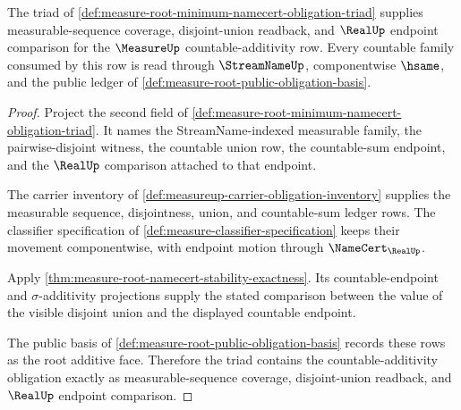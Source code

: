 \begin{theorem}
\label{thm:measure-root-minimum-countable-additivity-obligation}
The triad of
\autoref{def:measure-root-minimum-namecert-obligation-triad} supplies
measurable-sequence coverage, disjoint-union readback, and
$\RealUp$ endpoint comparison for the $\MeasureUp$ countable-additivity row.
Every countable family consumed by this row is read through
$\StreamNameUp$, componentwise $\hsame$, and the public ledger of
\autoref{def:measure-root-public-obligation-basis}.
\end{theorem}
\begin{proof}
Project the second field of
\autoref{def:measure-root-minimum-namecert-obligation-triad}. It names the
StreamName-indexed measurable family, the pairwise-disjoint witness, the
countable union row, the countable-sum endpoint, and the $\RealUp$ comparison
attached to that endpoint.

The carrier inventory of
\autoref{def:measureup-carrier-obligation-inventory} supplies the measurable
sequence, disjointness, union, and countable-sum ledger rows. The classifier
specification of \autoref{def:measure-classifier-specification} keeps their
movement componentwise, with endpoint motion through
$\NameCert_{\RealUp}$.

Apply \autoref{thm:measure-root-namecert-stability-exactness}. Its
countable-endpoint and $\sigma$-additivity projections supply the stated
comparison between the value of the visible disjoint union and the displayed
countable endpoint.

The public basis of
\autoref{def:measure-root-public-obligation-basis} records these rows as the
root additive face. Therefore the triad contains the countable-additivity
obligation exactly as measurable-sequence coverage, disjoint-union readback,
and $\RealUp$ endpoint comparison.
\end{proof}

